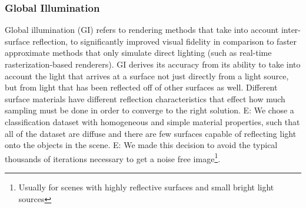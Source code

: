 \documentclass[10pt,twocolumn,letterpaper]{article}
\newcommand{\tompson}[1]{{\color{green} JT: #1}}
\newcommand{\edit}[1]{{\color{red} E: #1}}
\begin{document}

\subsubsection{Global Illumination}\label{mitsuba_section}%

Global illumination (GI) refers to rendering methods that take into account inter-surface reflection, to significantly improved visual fidelity in comparison to faster approximate methods that only simulate direct lighting (such as real-time rasterization-based renderers).  GI derives its accuracy from its ability to take into account the light that arrives at a surface not just directly from a light source, but from light that has been reflected off of other surfaces as well. Different surface materials have different reflection characteristics that effect how much sampling must be done in order to converge to the right solution. \edit{We chose a classification dataset with homogeneous and simple material properties, such that all of the dataset}
are diffuse and there are few surfaces capable of reflecting light onto the objects in the scene.  \edit{We made this decision to avoid the typical thousands of iterations}%
 necessary to get a noise free image\footnote{Usually for scenes with highly reflective surfaces and small bright light sources}.
\end{document}
